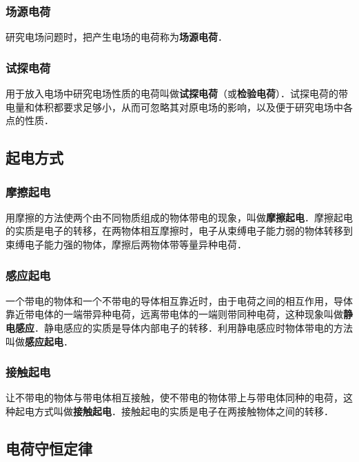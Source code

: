 \subsubsection{场源电荷}

研究电场问题时，把产生电场的电荷称为\textbf{场源电荷}．

\subsubsection{试探电荷}

用于放入电场中研究电场性质的电荷叫做\textbf{试探电荷}（或\textbf{检验电荷}）．试探电荷的带电量和体积都要求足够小，从而可忽略其对原电场的影响，以及便于研究电场中各点的性质．

\subsection{起电方式}

\subsubsection{摩擦起电}

用摩擦的方法使两个由不同物质组成的物体带电的现象，叫做\textbf{摩擦起电}．摩擦起电的实质是电子的转移，在两物体相互摩擦时，电子从束缚电子能力弱的物体转移到束缚电子能力强的物体，摩擦后两物体带等量异种电荷．

\subsubsection{感应起电}

一个带电的物体和一个不带电的导体相互靠近时，由于电荷之间的相互作用，导体靠近带电体的一端带异种电荷，远离带电体的一端则带同种电荷，这种现象叫做\textbf{静电感应}．静电感应的实质是导体内部电子的转移．利用静电感应时物体带电的方法叫做\textbf{感应起电}．

\subsubsection{接触起电}

让不带电的物体与带电体相互接触，使不带电的物体带上与带电体同种的电荷，这种起电方式叫做\textbf{接触起电}．接触起电的实质是电子在两接触物体之间的转移．

\subsection{电荷守恒定律}

